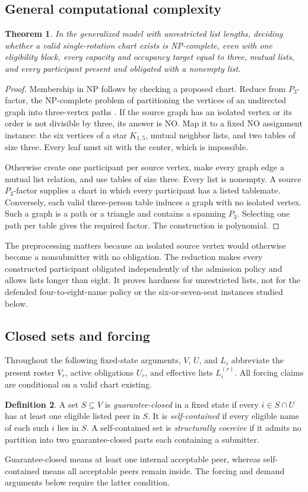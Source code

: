 \documentclass[11pt,a4paper]{article}
\newtheorem{theorem}{Theorem}
\theoremstyle{definition}\newtheorem{definition}[theorem]{Definition}
\theoremstyle{remark}\newtheorem{remark}[theorem]{Remark}
\begin{document}
\subsection{General computational complexity}
\begin{theorem}\label{thm:hard}
In the generalized model with unrestricted list lengths, deciding whether a valid single-rotation chart exists is NP-complete, even with one eligibility block, every capacity and occupancy target equal to three, mutual lists, and every participant present and obligated with a nonempty list.
\end{theorem}
\begin{proof}
Membership in NP follows by checking a proposed chart. Reduce from $P_3$-factor, the NP-complete problem of partitioning the vertices of an undirected graph into three-vertex paths \citep{kirkpatrick1983factor}. If the source graph has an isolated vertex or its order is not divisible by three, its answer is NO. Map it to a fixed NO assignment instance: the six vertices of a star $K_{1,5}$, mutual neighbor lists, and two tables of size three. Every leaf must sit with the center, which is impossible.

Otherwise create one participant per source vertex, make every graph edge a mutual list relation, and use tables of size three. Every list is nonempty. A source $P_3$-factor supplies a chart in which every participant has a listed tablemate. Conversely, each valid three-person table induces a graph with no isolated vertex. Such a graph is a path or a triangle and contains a spanning $P_3$. Selecting one path per table gives the required factor. The construction is polynomial.
\end{proof}
The preprocessing matters because an isolated source vertex would otherwise become a nonsubmitter with no obligation. The reduction makes every constructed participant obligated independently of the admission policy and allows lists longer than eight. It proves hardness for unrestricted lists, not for the defended four-to-eight-name policy or the six-or-seven-seat instances studied below.

\subsection{Closed sets and forcing}
Throughout the following fixed-state arguments, $V$, $U$, and $L_i$ abbreviate the present roster $V_r$, active obligations $U_r$, and effective lists $L_i^{(r)}$. All forcing claims are conditional on a valid chart existing.
\begin{definition}
A set $S\subseteq V$ is \emph{guarantee-closed} in a fixed state if every $i\in S\cap U$ has at least one eligible listed peer in $S$. It is \emph{self-contained} if every eligible name of each such $i$ lies in $S$. A self-contained set is \emph{structurally coercive} if it admits no partition into two guarantee-closed parts each containing a submitter.
\end{definition}
Guarantee-closed means at least one internal acceptable peer, whereas self-contained means all acceptable peers remain inside. The forcing and demand arguments below require the latter condition.
\end{document}
